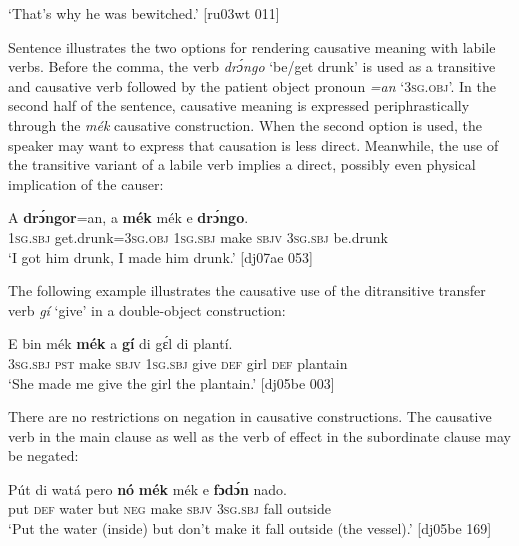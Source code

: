 \glt ‘That’s why he was bewitched.’ [ru03wt 011]
\z

Sentence  illustrates the two options for rendering causative meaning with labile verbs. Before the comma, the verb \textit{drɔ́ngo} ‘be/get drunk’ is used as a transitive and causative verb followed by the patient object pronoun \textit{=an} ‘\textsc{3sg.obj}’. In the second half of the sentence, causative meaning is expressed periphrastically through the \textit{mék} causative construction. When the second option is used, the speaker may want to express that causation is less direct. Meanwhile, the use of the transitive variant of a labile verb implies a direct, possibly even physical implication of the causer:


\ea%
    \label{ex:key:1325}
    \gll A    \textbf{drɔ́ngor}=an,    a    \textbf{mék}    mék    e    \textbf{drɔ́ngo}.\\
\textsc{1sg.sbj}  get.drunk=\textsc{3sg.obj}  \textsc{1sg.sbj}  make  \textsc{sbjv}    \textsc{3sg.sbj}  be.drunk\\

\glt ‘I got him drunk, I made him drunk.’ [dj07ae 053]
\z

The following example illustrates the causative use of the ditransitive transfer verb \textit{gí} ‘give’ in a double-object construction: 


\ea%
    \label{ex:key:1326}
    \gll E    bin  mék    \textbf{mék}    a    \textbf{gí}  di  gɛ́l  di  plantí.\\
\textsc{3sg.sbj}  \textsc{pst}  make  \textsc{sbjv}    \textsc{1sg.sbj}  give  \textsc{def}  girl  \textsc{def}  plantain\\

\glt ‘She made me give the girl the plantain.’ [dj05be 003]
\z

There are no restrictions on negation in causative constructions. The causative verb in the main clause  as well as the verb of effect in the subordinate clause  may be negated: 


\ea%
    \label{ex:key:1327}
    \gll Pút  di  watá  pero  \textbf{nó}  \textbf{mék}    mék    e    \textbf{fɔdɔ́n}  nado.\\
put  \textsc{def}  water  but    \textsc{neg}  make  \textsc{sbjv}    \textsc{3sg.sbj}  fall    outside\\

\glt ‘Put the water (inside) but don’t make it fall outside (the vessel).’ [dj05be 169]
\z


